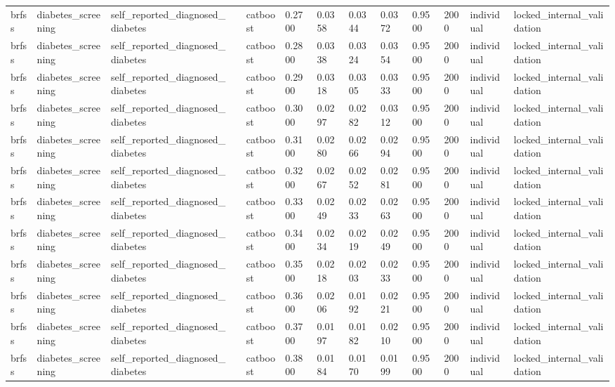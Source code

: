 \begin{tabular}{lllllllllllll}
brfss & diabetes\_screening & self\_reported\_diagnosed\_diabetes &  & catboost & 0.2700 & 0.0358 & 0.0344 & 0.0372 & 0.9500 & 2000 & individual & locked\_internal\_validation \\
brfss & diabetes\_screening & self\_reported\_diagnosed\_diabetes &  & catboost & 0.2800 & 0.0338 & 0.0324 & 0.0354 & 0.9500 & 2000 & individual & locked\_internal\_validation \\
brfss & diabetes\_screening & self\_reported\_diagnosed\_diabetes &  & catboost & 0.2900 & 0.0318 & 0.0305 & 0.0333 & 0.9500 & 2000 & individual & locked\_internal\_validation \\
brfss & diabetes\_screening & self\_reported\_diagnosed\_diabetes &  & catboost & 0.3000 & 0.0297 & 0.0282 & 0.0312 & 0.9500 & 2000 & individual & locked\_internal\_validation \\
brfss & diabetes\_screening & self\_reported\_diagnosed\_diabetes &  & catboost & 0.3100 & 0.0280 & 0.0266 & 0.0294 & 0.9500 & 2000 & individual & locked\_internal\_validation \\
brfss & diabetes\_screening & self\_reported\_diagnosed\_diabetes &  & catboost & 0.3200 & 0.0267 & 0.0252 & 0.0281 & 0.9500 & 2000 & individual & locked\_internal\_validation \\
brfss & diabetes\_screening & self\_reported\_diagnosed\_diabetes &  & catboost & 0.3300 & 0.0249 & 0.0233 & 0.0263 & 0.9500 & 2000 & individual & locked\_internal\_validation \\
brfss & diabetes\_screening & self\_reported\_diagnosed\_diabetes &  & catboost & 0.3400 & 0.0234 & 0.0219 & 0.0249 & 0.9500 & 2000 & individual & locked\_internal\_validation \\
brfss & diabetes\_screening & self\_reported\_diagnosed\_diabetes &  & catboost & 0.3500 & 0.0218 & 0.0203 & 0.0233 & 0.9500 & 2000 & individual & locked\_internal\_validation \\
brfss & diabetes\_screening & self\_reported\_diagnosed\_diabetes &  & catboost & 0.3600 & 0.0206 & 0.0192 & 0.0221 & 0.9500 & 2000 & individual & locked\_internal\_validation \\
brfss & diabetes\_screening & self\_reported\_diagnosed\_diabetes &  & catboost & 0.3700 & 0.0197 & 0.0182 & 0.0210 & 0.9500 & 2000 & individual & locked\_internal\_validation \\
brfss & diabetes\_screening & self\_reported\_diagnosed\_diabetes &  & catboost & 0.3800 & 0.0184 & 0.0170 & 0.0199 & 0.9500 & 2000 & individual & locked\_internal\_validation \\

\end{tabular}
